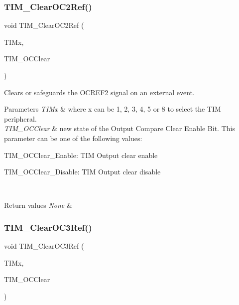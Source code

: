 \subsubsection{\texorpdfstring{TIM\_ClearOC2Ref()}{TIM\_ClearOC2Ref()}}
{\footnotesize\ttfamily void T\+I\+M\+\_\+\+Clear\+O\+C2\+Ref (\begin{DoxyParamCaption}\item[{\mbox{\hyperlink{struct_t_i_m___type_def}{T\+I\+M\+\_\+\+Type\+Def}} $\ast$}]{T\+I\+Mx,  }\item[{uint16\+\_\+t}]{T\+I\+M\+\_\+\+O\+C\+Clear }\end{DoxyParamCaption})}



Clears or safeguards the O\+C\+R\+E\+F2 signal on an external event. 


\begin{DoxyParams}{Parameters}
{\em T\+I\+Mx} & where x can be 1, 2, 3, 4, 5 or 8 to select the T\+IM peripheral. \\
\hline
{\em T\+I\+M\+\_\+\+O\+C\+Clear} & new state of the Output Compare Clear Enable Bit. This parameter can be one of the following values\+: \begin{DoxyItemize}
\item T\+I\+M\+\_\+\+O\+C\+Clear\+\_\+\+Enable\+: T\+IM Output clear enable \item T\+I\+M\+\_\+\+O\+C\+Clear\+\_\+\+Disable\+: T\+IM Output clear disable \end{DoxyItemize}
\\
\hline
\end{DoxyParams}

\begin{DoxyRetVals}{Return values}
{\em None} & \\
\hline
\end{DoxyRetVals}
\mbox{\label{group___t_i_m___private___functions_ga0bd9476a14bd346c319945ec4fa2bc67}} 
\subsubsection{\texorpdfstring{TIM\_ClearOC3Ref()}{TIM\_ClearOC3Ref()}}
{\footnotesize\ttfamily void T\+I\+M\+\_\+\+Clear\+O\+C3\+Ref (\begin{DoxyParamCaption}\item[{\mbox{\hyperlink{struct_t_i_m___type_def}{T\+I\+M\+\_\+\+Type\+Def}} $\ast$}]{T\+I\+Mx,  }\item[{uint16\+\_\+t}]{T\+I\+M\+\_\+\+O\+C\+Clear }\end{DoxyParamCaption})}



